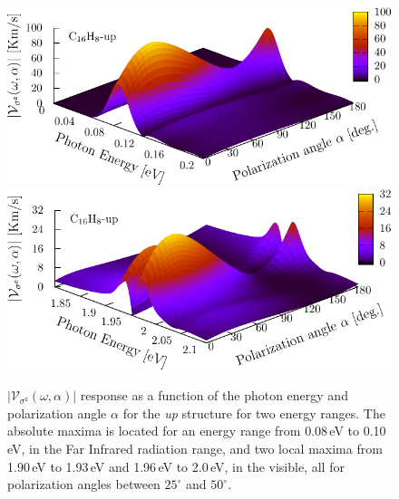 \documentclass[prb,11pt,tightenlines,twocolumn,aps]{revtex4-1}
\begin{document}

\begin{figure}[t]
    \centering
    \includegraphics[width=\linewidth]{upplots/up-3d-svaz-1}
    \label{fig:up-3d-vsz-1}
    \\
    \includegraphics[width=\linewidth]{upplots/up-3d-svaz-2}
    \label{fig:up-3d-vsz-2}

    \caption{$|\mathcal{V}_{\sigma^{\mathrm{z}}}(\omega,\alpha)|$ response
    as a function of the photon energy and polarization angle $\alpha$ for the
    \emph{up} structure for two energy ranges. The absolute maxima is located
    for an energy range from 0.08\,eV to 0.10\,eV, in the Far Infrared radiation
    range, and two local maxima from 1.90\,eV to 1.93\,eV and  1.96\,eV to
    2.0\,eV, in the visible, all for polarization angles between $25^{\circ}$
    and $50^{\circ}$.}
    \label{fig:up-3d-vsz}   
\end{figure}
\end{document}
